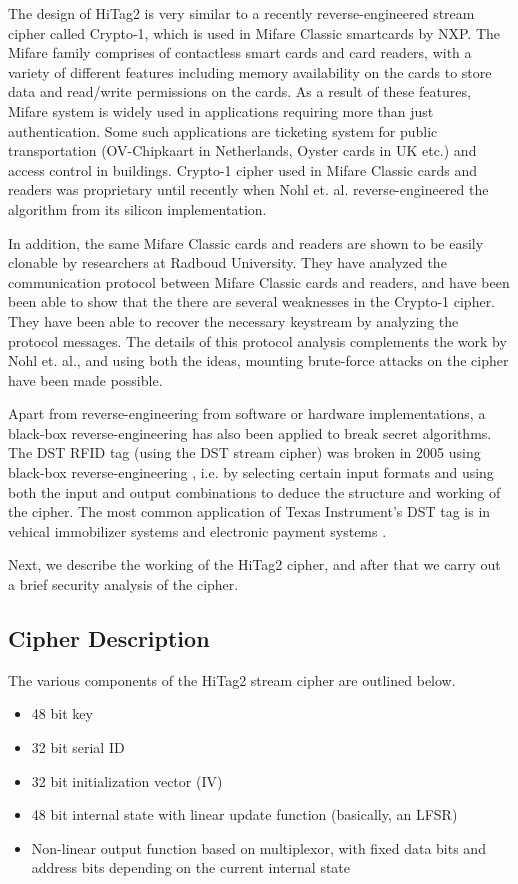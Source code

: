 The design of HiTag2 is very similar to a recently reverse-engineered \cite{NohlESP-2008-usenix} stream cipher called Crypto-1, which is used in Mifare Classic smartcards by NXP. The Mifare family comprises of contactless smart cards and card readers, with a variety of different features including memory availability on the cards to store data and read/write permissions on the cards. As a result of these features, Mifare system is widely used in applications requiring more than just authentication. Some such applications are ticketing system for public transportation (OV-Chipkaart in Netherlands, Oyster cards in UK etc.) and access control in buildings. Crypto-1 cipher used in Mifare Classic cards and readers was proprietary until recently when Nohl et. al. \cite{NohlESP-2008-usenix} reverse-engineered the algorithm from its silicon implementation.

In addition, the same Mifare Classic cards and readers are shown to be easily clonable \cite{dekoninggans2008pam} by researchers at Radboud University. They have analyzed the communication protocol between Mifare Classic cards and readers, and have been been able to show that the there are several weaknesses in the Crypto-1 cipher. They have been able to recover the necessary keystream by analyzing the protocol messages. The details of this protocol analysis complements the work by Nohl et. al., and using both the ideas, mounting brute-force attacks on the cipher have been made possible. 

Apart from reverse-engineering from software or hardware implementations, a black-box reverse-engineering has also been applied to break secret algorithms. The DST RFID tag (using the DST stream cipher) was broken in 2005 using black-box reverse-engineering \cite{bono2005sac}, i.e. by selecting certain input formats and using both the input and output combinations to deduce the structure and working of the cipher. The most common application of Texas Instrument's DST tag is in vehical immobilizer systems and electronic payment systems \cite{dst-rfid-analysis}. 

Next, we describe the working of the HiTag2 cipher, and after that we carry out a brief security analysis of the cipher.

\subsection{Cipher Description}
The various components of the HiTag2 stream cipher are outlined below. 
\begin{itemize}
\item 48 bit key
\item 32 bit serial ID
\item 32 bit initialization vector (IV)
\item 48 bit internal state with linear update function (basically, an LFSR)
\item Non-linear output function based on multiplexor, with fixed data bits and address bits depending on the current internal state
\end{itemize}


